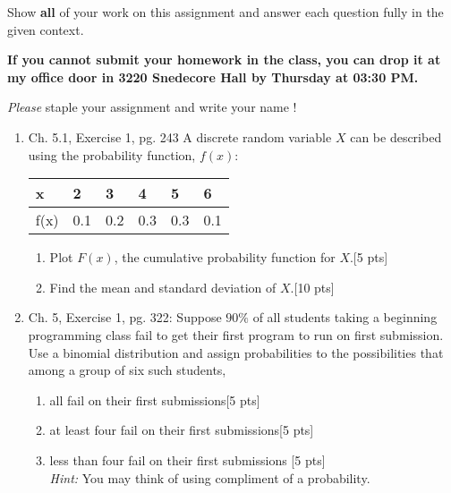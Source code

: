 \documentclass[11pt]{article}\usepackage[]{graphicx}\usepackage[]{color}
\begin{document}

\pagestyle{fancy} 

Show \textbf{all} of your work on this assignment and answer each question fully in the given context. 

\vspace{0.3cm}

\textbf{If you cannot submit your homework in the class, you can drop it at my office door in 3220 Snedecore Hall by Thursday at 03:30 PM.}

\vspace{0.3cm}

\emph{Please} staple your assignment and write your name !

\begin{enumerate}
	
	\item Ch. 5.1, Exercise 1, pg. 243 A discrete random variable $X$ can be described using the probability function, $f(x)$:


 \begin{table}[h!]
     \centering
     \begin{tabular}{llllll}
        \hline
         x  & 2  & 3 &  4  & 5 & 6     \\\hline \hline
         f(x) & 0.1 &  0.2 & 0.3  & 0.3 &  0.1  \\\hline \hline

     \end{tabular}
  \end{table}
    
    \begin{enumerate}
          \item  Plot $F(x)$, the cumulative probability function for $X$.[5 pts]
          
          \item Find the mean and standard deviation of $X$.[10 pts]
    \end{enumerate}      
    	
	
	
	\item Ch. 5, Exercise 1, pg. 322: Suppose $90\%$ of all students taking a beginning programming class fail to get their first program to run on first submission. Use a binomial distribution and assign probabilities to the possibilities that among a group of six such students,
	\begin{enumerate}
        \item all fail on their first submissions[5 pts]
        \item  at least four fail on their first submissions[5 pts]
        \item  less than four fail on their first submissions [5 pts] \\
        \emph{Hint:} You may think of using compliment of a probability. 
\\
    

\end{enumerate}
\end{enumerate}
\end{document}
